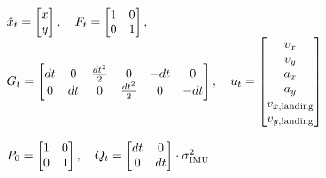\documentclass[conference, onecolumn, draftclsnofoot]{IEEEtran}
\begin{document}
\begin{equation*}
\begin{array}{l}


 \hat{x}_{t} = \begin{bmatrix} 
                x \\ 
                y
                \end{bmatrix} ,  \quad
F_{t} = \begin{bmatrix} 
                1 & 0 \\ 
                0 & 1
                \end{bmatrix}      , \\     
G_{t} =   \begin{bmatrix} 
                dt & 0 & \frac{dt^{2}}{2} & 0 & -dt & 0\\ 
                0 & dt & 0 & \frac{dt^{2}}{2} &0 & -dt
                \end{bmatrix} , \quad
u_{t} = \begin{bmatrix} 
                v_x \\ 
                v_y \\
                a_x \\
                a_y \\
                v_{x,\textrm{landing}}\\
                v_{y,\textrm{landing}}
                \end{bmatrix}  \\ \\               
P_{0} =  \begin{bmatrix} 
                1 & 0 \\ 
                0 & 1
                \end{bmatrix}   , \quad 
Q_{t}  =\begin{bmatrix} 
                dt & 0 \\ 
                0 & dt
                \end{bmatrix} \cdot \sigma^{2}_{\textrm{IMU}}
\end{array} \\
\end{equation*}
\end{document}

